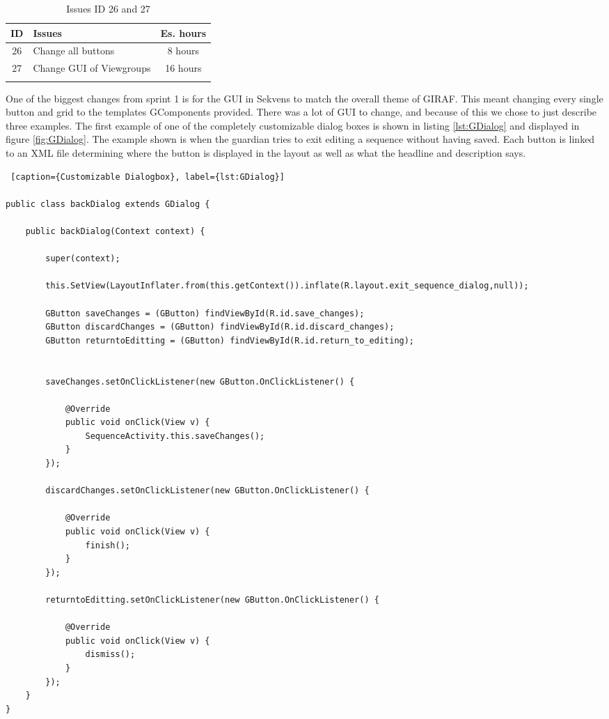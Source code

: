 
\begin{longtable} { | c | p{12cm} | c | } 
\hline
	ID 	&	Issues	&		 Es. hours \\\hline
	26	& 	Change all buttons	&	8 hours	\\\hline
	27	& 	Change GUI of Viewgroups	&	16 hours	\\\hline
\caption{Issues ID 26 and 27}
\label{tab:spr2_GUIchange}
\end{longtable}

One of the biggest changes from sprint 1 is for the GUI in Sekvens to match the overall theme of GIRAF. This meant changing every single button and grid to the templates GComponents provided. There was a lot of GUI to change, and because of this we chose to just describe three examples. The first example of one of the completely customizable dialog boxes is shown in listing \ref{lst:GDialog} and displayed in figure \ref{fig:GDialog}. The example shown is when the guardian tries to exit editing a sequence without having saved. Each button is linked to an XML file determining where the button is displayed in the layout as well as what the headline and description says.

\begin{lstlisting} [caption={Customizable Dialogbox}, label={lst:GDialog}]

public class backDialog extends GDialog {

    public backDialog(Context context) {

        super(context);

        this.SetView(LayoutInflater.from(this.getContext()).inflate(R.layout.exit_sequence_dialog,null));

        GButton saveChanges = (GButton) findViewById(R.id.save_changes);
        GButton discardChanges = (GButton) findViewById(R.id.discard_changes);
        GButton returntoEditting = (GButton) findViewById(R.id.return_to_editing);


        saveChanges.setOnClickListener(new GButton.OnClickListener() {

            @Override
            public void onClick(View v) {
                SequenceActivity.this.saveChanges();
            }
        });

        discardChanges.setOnClickListener(new GButton.OnClickListener() {

            @Override
            public void onClick(View v) {
                finish();
            }
        });

        returntoEditting.setOnClickListener(new GButton.OnClickListener() {

            @Override
            public void onClick(View v) {
                dismiss();
            }
        });
    }
}
\end{lstlisting}


